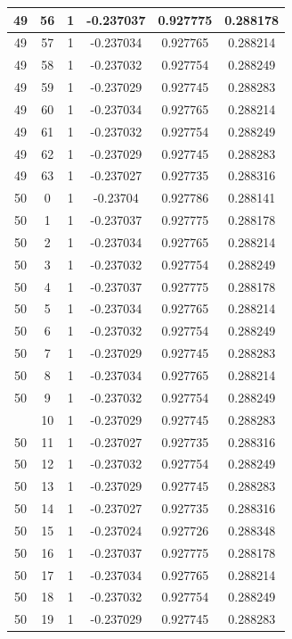 \documentclass[12pt,a4paper]{article}
\numberwithin{equation}{section}
\numberwithin{figure}{section}
\numberwithin{table}{section}
\begin{document}
\begin{longtable}{|c|c|c|c|c|c|}
49 & 56 & 1 & -0.237037 & 0.927775 & 0.288178 \\ \hline
49 & 57 & 1 & -0.237034 & 0.927765 & 0.288214 \\ \hline
49 & 58 & 1 & -0.237032 & 0.927754 & 0.288249 \\ \hline
49 & 59 & 1 & -0.237029 & 0.927745 & 0.288283 \\ \hline
49 & 60 & 1 & -0.237034 & 0.927765 & 0.288214 \\ \hline
49 & 61 & 1 & -0.237032 & 0.927754 & 0.288249 \\ \hline
49 & 62 & 1 & -0.237029 & 0.927745 & 0.288283 \\ \hline
49 & 63 & 1 & -0.237027 & 0.927735 & 0.288316 \\ \hline
50 & 0 & 1 & -0.23704 & 0.927786 & 0.288141 \\ \hline
50 & 1 & 1 & -0.237037 & 0.927775 & 0.288178 \\ \hline
50 & 2 & 1 & -0.237034 & 0.927765 & 0.288214 \\ \hline
50 & 3 & 1 & -0.237032 & 0.927754 & 0.288249 \\ \hline
50 & 4 & 1 & -0.237037 & 0.927775 & 0.288178 \\ \hline
50 & 5 & 1 & -0.237034 & 0.927765 & 0.288214 \\ \hline
50 & 6 & 1 & -0.237032 & 0.927754 & 0.288249 \\ \hline
50 & 7 & 1 & -0.237029 & 0.927745 & 0.288283 \\ \hline
50 & 8 & 1 & -0.237034 & 0.927765 & 0.288214 \\ \hline
50 & 9 & 1 & -0.237032 & 0.927754 & 0.288249 \\ \hline
\pagebreak
50 & 10 & 1 & -0.237029 & 0.927745 & 0.288283 \\ \hline
50 & 11 & 1 & -0.237027 & 0.927735 & 0.288316 \\ \hline
50 & 12 & 1 & -0.237032 & 0.927754 & 0.288249 \\ \hline
50 & 13 & 1 & -0.237029 & 0.927745 & 0.288283 \\ \hline
50 & 14 & 1 & -0.237027 & 0.927735 & 0.288316 \\ \hline
50 & 15 & 1 & -0.237024 & 0.927726 & 0.288348 \\ \hline
50 & 16 & 1 & -0.237037 & 0.927775 & 0.288178 \\ \hline
50 & 17 & 1 & -0.237034 & 0.927765 & 0.288214 \\ \hline
50 & 18 & 1 & -0.237032 & 0.927754 & 0.288249 \\ \hline
50 & 19 & 1 & -0.237029 & 0.927745 & 0.288283 \\ \hline

\end{longtable}
\end{document}
